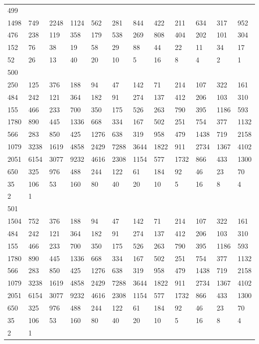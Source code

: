 \begin{longtable}{llllllllllll}
499&&&&&&&&&&&\\
1498& 749& 2248& 1124& 562& 281& 844& 422& 211& 634& 317& 952\\
476& 238& 119& 358& 179& 538& 269& 808& 404& 202& 101& 304\\
152& 76& 38& 19& 58& 29& 88& 44& 22& 11& 34& 17\\
52& 26& 13& 40& 20& 10& 5& 16& 8& 4& 2& 1\\

500&&&&&&&&&&&\\
250& 125& 376& 188& 94& 47& 142& 71& 214& 107& 322& 161\\
484& 242& 121& 364& 182& 91& 274& 137& 412& 206& 103& 310\\
155& 466& 233& 700& 350& 175& 526& 263& 790& 395& 1186& 593\\
1780& 890& 445& 1336& 668& 334& 167& 502& 251& 754& 377& 1132\\
566& 283& 850& 425& 1276& 638& 319& 958& 479& 1438& 719& 2158\\
1079& 3238& 1619& 4858& 2429& 7288& 3644& 1822& 911& 2734& 1367& 4102\\
2051& 6154& 3077& 9232& 4616& 2308& 1154& 577& 1732& 866& 433& 1300\\
650& 325& 976& 488& 244& 122& 61& 184& 92& 46& 23& 70\\
35& 106& 53& 160& 80& 40& 20& 10& 5& 16& 8& 4\\
2& 1& \\

501&&&&&&&&&&&\\
1504& 752& 376& 188& 94& 47& 142& 71& 214& 107& 322& 161\\
484& 242& 121& 364& 182& 91& 274& 137& 412& 206& 103& 310\\
155& 466& 233& 700& 350& 175& 526& 263& 790& 395& 1186& 593\\
1780& 890& 445& 1336& 668& 334& 167& 502& 251& 754& 377& 1132\\
566& 283& 850& 425& 1276& 638& 319& 958& 479& 1438& 719& 2158\\
1079& 3238& 1619& 4858& 2429& 7288& 3644& 1822& 911& 2734& 1367& 4102\\
2051& 6154& 3077& 9232& 4616& 2308& 1154& 577& 1732& 866& 433& 1300\\
650& 325& 976& 488& 244& 122& 61& 184& 92& 46& 23& 70\\
35& 106& 53& 160& 80& 40& 20& 10& 5& 16& 8& 4\\
2& 1& \\


\end{longtable}
